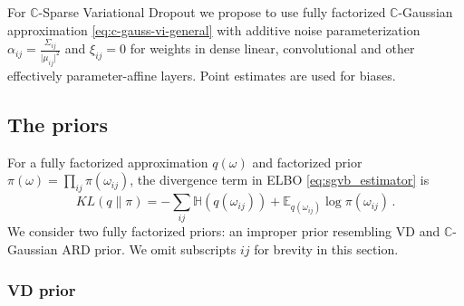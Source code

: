 \documentclass[a4paper,10pt,twocolumn]{article}
\newcommand{\cplx}{\mathbb{C}}
\begin{document}
For $\cplx$-Sparse Variational Dropout we propose to use fully factorized $\cplx$-Gaussian
approximation \eqref{eq:c-gauss-vi-general} with additive noise parameterization $
  \alpha_{ij} = \tfrac{\Sigma_{ij}}{\lvert \mu_{ij} \rvert^2}
$ and $\xi_{ij} = 0$ for weights in dense linear, convolutional and other effectively
parameter-affine layers. Point estimates are used for biases.


\subsection{The priors} %
\label{sub:the_priors}

For a fully factorized approximation $q(\omega)$ and factorized prior $
  \pi(\omega) = \prod_{ij} \pi(\omega_{ij})
$, the divergence term in ELBO \eqref{eq:sgvb_estimator} is
\begin{equation}  \label{eq:elbo-general-kl-div}
  KL(q \| \pi)
    = - \sum_{ij}
        \mathbb{H}(q(\omega_{ij}))
        + \mathbb{E}_{q(\omega_{ij})} \log{\pi(\omega_{ij})}
    \,.
\end{equation}
We consider two fully factorized priors: an improper prior resembling VD and $\cplx$-Gaussian
ARD prior. We omit subscripts ${ij}$ for brevity in this section.

\subsubsection{VD prior} %
\label{ssub:vd_prior}
\end{document}
